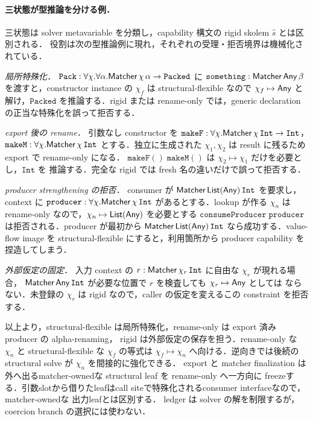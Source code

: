 \paragraph{三状態が型推論を分ける例．}
三状態は solver metavariable を分類し，capability 構文の rigid skolem $\hat s$ とは区別される．
役割は次の型推論例に現れ，それぞれの受理・拒否境界は機械化されている．

\emph{局所特殊化．}
$\mathtt{Pack}:\forall\chi.\forall\alpha.\mathsf{Matcher}\,\chi\,\alpha\to\mathtt{Packed}$ に
$\mathtt{something}:\mathsf{Matcher}\,\mathsf{Any}\,\beta$ を渡すと，constructor instance の $\chi_f$ は
structural-flexible なので $\chi_f\mapsto\mathsf{Any}$ と解け，$\mathtt{Packed}$ を推論する．rigid または
rename-only では，generic declaration の正当な特殊化を誤って拒否する．

\emph{export 後の rename．}
引数なし constructor を
$\mathtt{makeF}:\forall\chi.\mathsf{Matcher}\,\chi\,\mathtt{Int}\to\mathtt{Int}$，
$\mathtt{makeM}:\forall\chi.\mathsf{Matcher}\,\chi\,\mathtt{Int}$ とする．独立に生成された
$\chi_1,\chi_2$ は result に残るため export で rename-only になる．
$\mathtt{makeF}()\;\mathtt{makeM}()$ は $\chi_2\mapsto\chi_1$ だけを必要とし，$\mathtt{Int}$ を
推論する．完全な rigid では fresh 名の違いだけで誤って拒否する．

\emph{producer strengthening の拒否．}
consumer が $\mathsf{Matcher}\,\mathsf{List}(\mathsf{Any})\,\mathtt{Int}$ を要求し，context に
$\mathtt{producer}:\forall\chi.\mathsf{Matcher}\,\chi\,\mathtt{Int}$ があるとする．lookup が作る
$\chi_n$ は rename-only なので，$\chi_n\mapsto\mathsf{List}(\mathsf{Any})$ を必要とする
$\mathtt{consumeProducer}\;\mathtt{producer}$ は拒否される．producer が最初から
$\mathsf{Matcher}\,\mathsf{List}(\mathsf{Any})\,\mathtt{Int}$ なら成功する．value-flow image を structural-flexible
にすると，利用箇所から producer capability を捏造してしまう．

\emph{外部仮定の固定．}
入力 context の $r:\mathsf{Matcher}\,\chi_r\,\mathtt{Int}$ に自由な $\chi_r$ が現れる場合，
$\mathsf{Matcher}\,\mathsf{Any}\,\mathtt{Int}$ が必要な位置で $r$ を検査しても $\chi_r\mapsto\mathsf{Any}$ としては
ならない．未登録の $\chi_r$ は rigid なので，caller の仮定を変えるこの constraint を拒否する．

以上より，structural-flexible は局所特殊化，rename-only は export 済み producer の alpha-renaming，
rigid は外部仮定の保存を担う．rename-only な $\chi_n$ と structural-flexible な $\chi_f$ の等式は
$\chi_f\mapsto\chi_n$ へ向ける．逆向きでは後続の structural solve が $\chi_n$ を間接的に強化できる．
export と matcher finalization は外へ出るmatcher-ownedな structural leaf を rename-only へ一方向に
freezeする．引数slotから借りたleafはcall siteで特殊化されるconsumer interfaceなので，matcher-ownedな
出力leafとは区別する．
ledger は solver の解を制限するが，coercion branch の選択には使わない．

